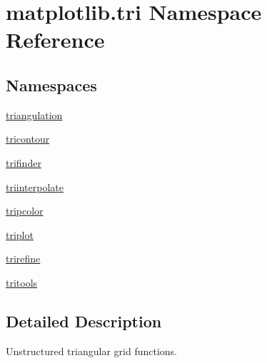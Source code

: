 \hypertarget{namespacematplotlib_1_1tri}{}\section{matplotlib.\+tri Namespace Reference}
\label{namespacematplotlib_1_1tri}
\subsection*{Namespaces}
\begin{DoxyCompactItemize}
\item 
 \hyperlink{namespacematplotlib_1_1tri_1_1triangulation}{triangulation}
\item 
 \hyperlink{namespacematplotlib_1_1tri_1_1tricontour}{tricontour}
\item 
 \hyperlink{namespacematplotlib_1_1tri_1_1trifinder}{trifinder}
\item 
 \hyperlink{namespacematplotlib_1_1tri_1_1triinterpolate}{triinterpolate}
\item 
 \hyperlink{namespacematplotlib_1_1tri_1_1tripcolor}{tripcolor}
\item 
 \hyperlink{namespacematplotlib_1_1tri_1_1triplot}{triplot}
\item 
 \hyperlink{namespacematplotlib_1_1tri_1_1trirefine}{trirefine}
\item 
 \hyperlink{namespacematplotlib_1_1tri_1_1tritools}{tritools}
\end{DoxyCompactItemize}


\subsection{Detailed Description}
\begin{DoxyVerb}Unstructured triangular grid functions.
\end{DoxyVerb}
 